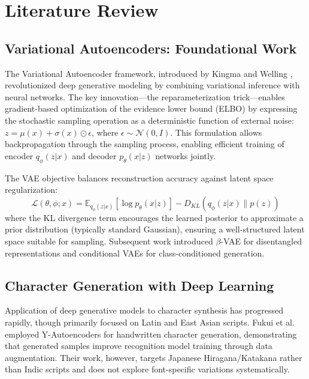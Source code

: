 \documentclass[review]{elsarticle}
\begin{document}
\section{Literature Review}
\label{sec:literature}

\subsection{Variational Autoencoders: Foundational Work}

The Variational Autoencoder framework, introduced by Kingma and Welling \cite{kingma2013}, revolutionized deep generative modeling by combining variational inference with neural networks. The key innovation—the reparameterization trick—enables gradient-based optimization of the evidence lower bound (ELBO) by expressing the stochastic sampling operation as a deterministic function of external noise: $z = \mu(x) + \sigma(x) \odot \epsilon$, where $\epsilon \sim \mathcal{N}(0, I)$. This formulation allows backpropagation through the sampling process, enabling efficient training of encoder $q_\phi(z|x)$ and decoder $p_\theta(x|z)$ networks jointly.

The VAE objective balances reconstruction accuracy against latent space regularization:
\begin{equation}
\mathcal{L}(\theta, \phi; x) = \mathbb{E}_{q_\phi(z|x)}[\log p_\theta(x|z)] - D_{KL}(q_\phi(z|x) \| p(z))
\end{equation}
where the KL divergence term encourages the learned posterior to approximate a prior distribution (typically standard Gaussian), ensuring a well-structured latent space suitable for sampling. Subsequent work introduced $\beta$-VAE \cite{higgins2017} for disentangled representations and conditional VAEs \cite{wang2021} for class-conditioned generation.

\subsection{Character Generation with Deep Learning}

Application of deep generative models to character synthesis has progressed rapidly, though primarily focused on Latin and East Asian scripts. Fukui et al. \cite{fukui2022} employed Y-Autoencoders for handwritten character generation, demonstrating that generated samples improve recognition model training through data augmentation. Their work, however, targets Japanese Hiragana/Katakana rather than Indic scripts and does not explore font-specific variations systematically.
\end{document}
